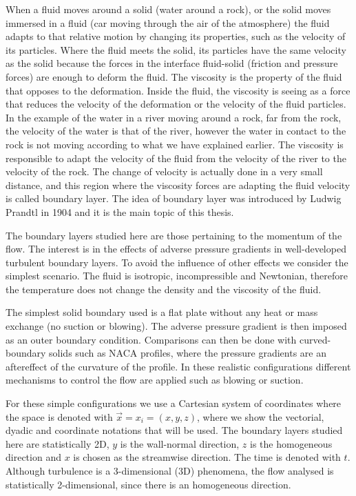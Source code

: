 When a fluid moves around a solid (water around a rock), or the solid moves immersed in a fluid  (car moving through the air of the atmosphere) the fluid adapts to that relative motion by changing its properties, such as the velocity of its particles.
Where the fluid meets the solid, its particles have the same velocity as the solid because the forces in the interface fluid-solid (friction and pressure forces) are enough to deform the fluid.
The viscosity is the property of the fluid that opposes to the deformation. Inside the fluid, the viscosity is seeing as a force that reduces the velocity of the deformation or the velocity of the fluid particles.
In the example of the water in a river moving around a rock, far from the rock, the velocity of the water is that of the river, however the water in contact to the rock is not moving according to what we have explained earlier. The viscosity is responsible to adapt the velocity of the fluid from the velocity of the river to the velocity of the rock.
The change of velocity is actually done in a very small distance, and this region where the viscosity forces are adapting the fluid velocity is called boundary layer. 
The idea of boundary layer was introduced by Ludwig Prandtl in 1904 and it is the main topic of this thesis.

The boundary layers studied here are those pertaining to the momentum of the flow. The interest is in the effects of adverse pressure gradients in well-developed turbulent boundary layers. To avoid the influence of other effects we consider the simplest scenario.
The fluid is isotropic, incompressible and Newtonian, therefore the temperature does not change the density and the viscosity of the fluid.

The simplest solid boundary used is a flat plate without any heat or mass exchange (no suction or blowing). The adverse pressure gradient is then imposed as an outer boundary condition.
Comparisons can then be done with curved-boundary solids such as NACA profiles, where the pressure gradients are an aftereffect of the curvature of the profile. 
In these realistic configurations different mechanisms to control the flow are applied such as blowing or suction.

For these simple configurations we use a Cartesian system of coordinates where the space is denoted with $\vec{x}=x_i=(x,y,z)$, where we show the vectorial, dyadic and coordinate notations that will be used.
The boundary layers studied here are statistically 2D, $y$ is the wall-normal direction, $z$ is the homogeneous direction and $x$ is chosen as the streamwise direction. The time is denoted with $t$.
Although turbulence is a 3-dimensional (3D) phenomena, the flow analysed is statistically 2-dimensional, since there is an homogeneous direction. 